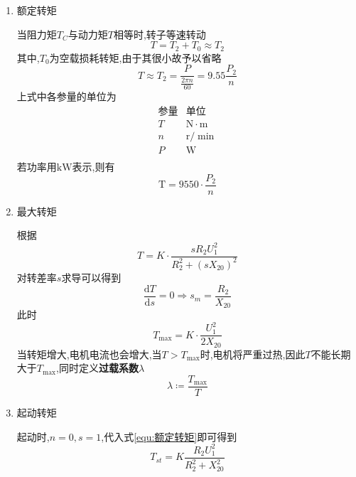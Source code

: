 \begin{enumerate}
    \item[\circledtext{1}]额定转矩
    
    \Par 当阻力矩$T_C$与动力矩$T$相等时,转子等速转动
    \begin{equation*}
        T=T_2+T_0\approx T_2
    \end{equation*}
    其中,$T_0$为空载损耗转矩,由于其很小故予以省略
    \begin{equation*}
        T\approx T_2=\frac{P}{\frac{2\pi n}{60}}=9.55\frac{P_2}{n}
    \end{equation*}
    上式中各参量的单位为
    \begin{equation*}
        \begin{matrix}
            \text{参量}&		\text{单位}\\
            T&		\mathrm{N}\cdot \mathrm{m}\\
            n&		\mathrm{r}/\min\\
            P&		\mathrm{W}\\
        \end{matrix}
    \end{equation*}
    若功率用$\mathrm{kW}$表示,则有
    \begin{equation}\label{equ:额定转矩}
        \mathrm{T}=9550\cdot \frac{P_2}{n}
    \end{equation}

    \item[\circledtext{2}]最大转矩
    
    \Par 根据
    \begin{equation*}
        T=K\cdot \frac{sR_2U_{1}^{2}}{R_{2}^{2}+\left( sX_{20} \right) ^2}
    \end{equation*}
    对转差率$s$求导可以得到
    \begin{equation*}
        \frac{\mathrm{d}T}{\mathrm{d}s}=0\Longrightarrow s_m=\frac{R_2}{X_{20}}
    \end{equation*}
    此时
    \begin{equation}
        T_{\max}=K\cdot \frac{U_{1}^{2}}{2X_{20}}
    \end{equation}
    当转矩增大,电机电流也会增大,当$T>T_{\max} $时,电机将严重过热,因此$T$不能长期大于$T_{\max }$,同时定义\textbf{过载系数}$\lambda $
    \begin{equation}
        \lambda \coloneqq \frac{T_{\max}}{T}
    \end{equation}

    \item[\circledtext{3}]起动转矩
    
    \Par 起动时,$n=0,s=1$,代入式\ref{equ:额定转矩}即可得到
    \begin{equation}
        T_{st}=K\frac{R_2U_{1}^{2}}{R_{2}^{2}+X_{20}^{2}}
    \end{equation}
\end{enumerate}